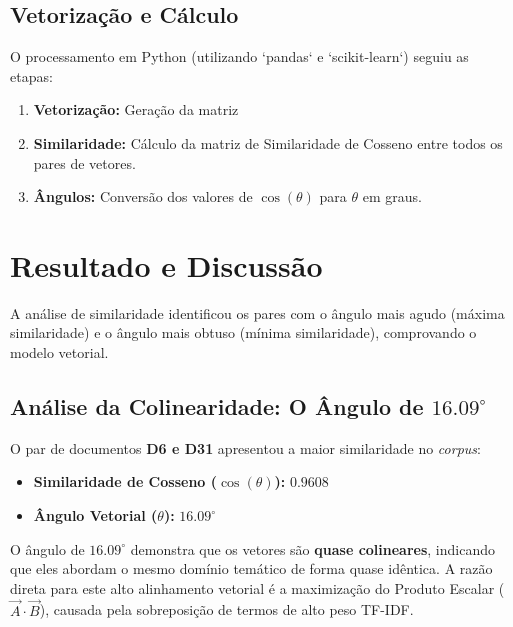 \documentclass[a4paper, 12pt]{article}
\begin{document}
\subsection{Vetorização e Cálculo}
O processamento em Python (utilizando `pandas` e `scikit-learn`) seguiu as etapas:
\begin{enumerate}
\item \textbf{Vetorização:} Geração da matriz \item \textbf{Similaridade:} Cálculo da matriz de Similaridade de Cosseno entre todos os pares de vetores.
\item \textbf{Ângulos:} Conversão dos valores de $\cos(\theta)$ para $\theta$ em graus.
\end{enumerate}

\section{Resultado e Discussão}

A análise de similaridade identificou os pares com o ângulo mais agudo (máxima similaridade) e o ângulo mais obtuso (mínima similaridade), comprovando o modelo vetorial.

\subsection{Análise da Colinearidade: O Ângulo de $16.09^\circ$}

O par de documentos \textbf{D6 e D31} apresentou a maior similaridade no \textit{corpus}:
\begin{itemize}
\item \textbf{Similaridade de Cosseno ($\cos(\theta)$):} $0.9608$
\item \textbf{Ângulo Vetorial ($\theta$):} $16.09^\circ$
\end{itemize}

O ângulo de $16.09^\circ$ demonstra que os vetores são \textbf{quase colineares}, indicando que eles abordam o mesmo domínio temático de forma quase idêntica. A razão direta para este alto alinhamento vetorial é a maximização do Produto Escalar ($\vec{A} \cdot \vec{B}$), causada pela sobreposição de termos de alto peso TF-IDF.
\end{document}
